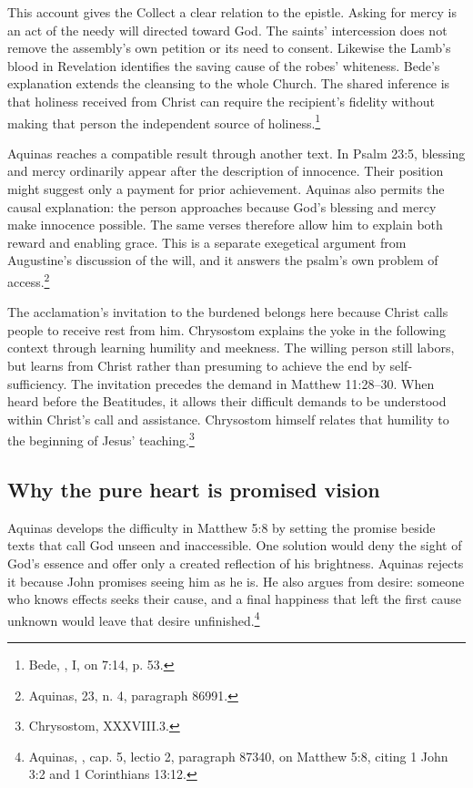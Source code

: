 This account gives the Collect a clear relation to the epistle. Asking for mercy is an act of the needy will directed toward God. The saints' intercession does not remove the assembly's own petition or its need to consent. Likewise the Lamb's blood in Revelation identifies the saving cause of the robes' whiteness. Bede's explanation extends the cleansing to the whole Church. The shared inference is that holiness received from Christ can require the recipient's fidelity without making that person the independent source of holiness.\footnote{Bede, , I, on 7:14, p. 53.}

Aquinas reaches a compatible result through another text. In Psalm 23:5, blessing and mercy ordinarily appear after the description of innocence. Their position might suggest only a payment for prior achievement. Aquinas also permits the causal explanation: the person approaches because God's blessing and mercy make innocence possible. The same verses therefore allow him to explain both reward and enabling grace. This is a separate exegetical argument from Augustine's discussion of the will, and it answers the psalm's own problem of access.\footnote{Aquinas,  23, n. 4, paragraph 86991.}

The acclamation's invitation to the burdened belongs here because Christ calls people to receive rest from him. Chrysostom explains the yoke in the following context through learning humility and meekness. The willing person still labors, but learns from Christ rather than presuming to achieve the end by self-sufficiency. The invitation precedes the demand in Matthew 11:28--30. When heard before the Beatitudes, it allows their difficult demands to be understood within Christ's call and assistance. Chrysostom himself relates that humility to the beginning of Jesus' teaching.\footnote{Chrysostom,  XXXVIII.3.}

\subsection{Why the pure heart is promised vision}
Aquinas develops the difficulty in Matthew 5:8 by setting the promise beside texts that call God unseen and inaccessible. One solution would deny the sight of God's essence and offer only a created reflection of his brightness. Aquinas rejects it because John promises seeing him as he is. He also argues from desire: someone who knows effects seeks their cause, and a final happiness that left the first cause unknown would leave that desire unfinished.\footnote{Aquinas, , cap. 5, lectio 2, paragraph 87340, on Matthew 5:8, citing 1 John 3:2 and 1 Corinthians 13:12.}

